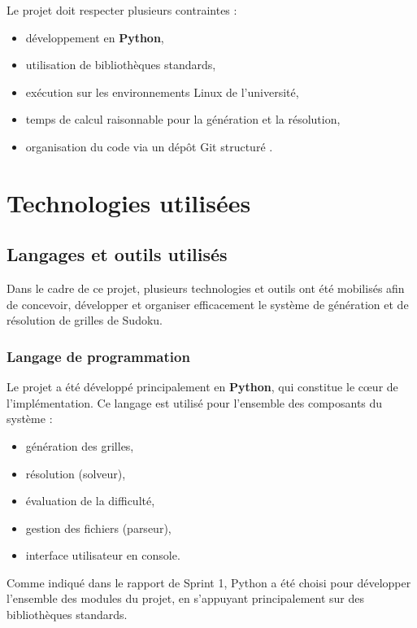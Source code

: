 \documentclass[a4paper]{article}
\begin{document}
Le projet doit respecter plusieurs contraintes :
\begin{itemize}
    \item développement en \textbf{Python},
    \item utilisation de bibliothèques standards,
    \item exécution sur les environnements Linux de l’université,
    \item temps de calcul raisonnable pour la génération et la résolution,
    \item organisation du code via un dépôt Git structuré \textbf{\cite{git}}.
\end{itemize}


\section{Technologies utilisées}

\subsection{Langages et outils utilisés}

Dans le cadre de ce projet, plusieurs technologies et outils ont été mobilisés afin de concevoir, développer et organiser efficacement le système de génération et de résolution de grilles de Sudoku.

\subsubsection{Langage de programmation}

Le projet a été développé principalement en \textbf{Python}, qui constitue le cœur de l’implémentation. Ce langage est utilisé pour l’ensemble des composants du système :
\begin{itemize}
    \item génération des grilles,
    \item résolution (solveur),
    \item évaluation de la difficulté,
    \item gestion des fichiers (parseur),
    \item interface utilisateur en console.
\end{itemize}

Comme indiqué dans le rapport de Sprint 1, Python a été choisi pour développer l’ensemble des modules du projet, en s’appuyant principalement sur des bibliothèques standards.
\end{document}
